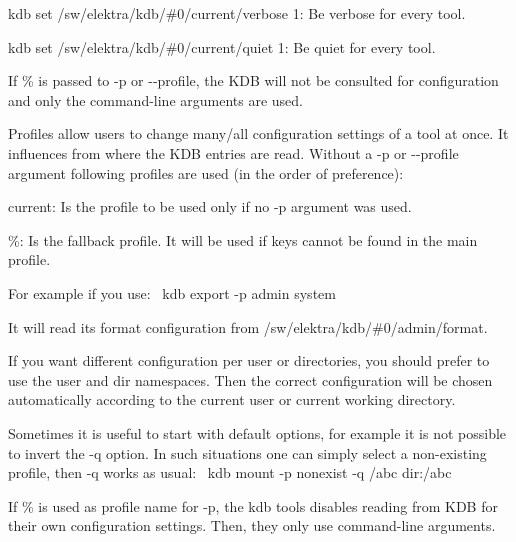 \begin{DoxyItemize}
\item {\ttfamily kdb set /sw/elektra/kdb/\#0/current/verbose 1}\+: Be verbose for every tool.
\item {\ttfamily kdb set /sw/elektra/kdb/\#0/current/quiet 1}\+: Be quiet for every tool.
\end{DoxyItemize}

If {\ttfamily \%} is passed to {\ttfamily -\/p} or {\ttfamily -\/-\/profile}, the K\+DB will not be consulted for configuration and only the command-\/line arguments are used.

Profiles allow users to change many/all configuration settings of a tool at once. It influences from where the K\+DB entries are read. Without a {\ttfamily -\/p} or {\ttfamily -\/-\/profile} argument following profiles are used (in the order of preference)\+:


\begin{DoxyItemize}
\item {\ttfamily current}\+: Is the profile to be used only if no {\ttfamily -\/p} argument was used.
\item {\ttfamily \%}\+: Is the fallback profile. It will be used if keys cannot be found in the main profile.
\end{DoxyItemize}

For example if you use\+:~\newline
 {\ttfamily kdb export -\/p admin system}

It will read its format configuration from {\ttfamily /sw/elektra/kdb/\#0/admin/format}.

If you want different configuration per user or directories, you should prefer to use the {\ttfamily user} and {\ttfamily dir} namespaces. Then the correct configuration will be chosen automatically according to the current user or current working directory.

Sometimes it is useful to start with default options, for example it is not possible to invert the {\ttfamily -\/q} option. In such situations one can simply select a non-\/existing profile, then {\ttfamily -\/q} works as usual\+:~\newline
 {\ttfamily kdb mount -\/p nonexist -\/q /abc dir\+:/abc}

If {\ttfamily \%} is used as profile name for {\ttfamily -\/p}, the {\ttfamily kdb} tools disables reading from {\ttfamily K\+DB} for their own configuration settings. Then, they only use command-\/line arguments.

